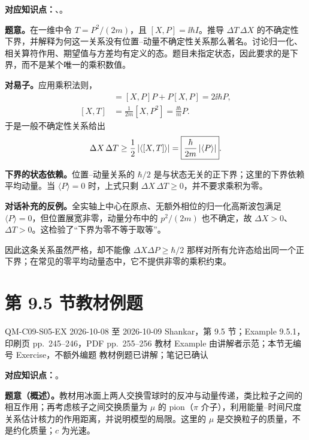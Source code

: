 \textbf{对应知识点：}、。

\textbf{题意。}在一维中令 $T=P^2/(2m)$，且 $[X,P]=\ii\hbar I$。推导 $\Delta T\,\Delta X$ 的不确定性下界，并解释为何这一关系没有位置--动量不确定性关系那么著名。讨论归一化、相关算符作用、期望值与方差均有定义的态。题目未指定状态，因此要求的是下界，而不是某个唯一的乘积数值。

\begin{checkedsolution}
\textbf{对易子。}应用乘积法则，
\begin{align}
  [X,P^2]&=[X,P]P+P[X,P]=2\ii\hbar P,\\
  [X,T]&=\frac1{2m}[X,P^2]=\boxed{\frac{\ii\hbar}{m}P}.
\end{align}
于是一般不确定性关系给出
\begin{equation}
  \Delta X\,\Delta T\ge\frac12\left|\langle[X,T]\rangle\right|
   =\boxed{\frac{\hbar}{2m}\left|\langle P\rangle\right|}.
\end{equation}

\textbf{下界的状态依赖。}位置--动量关系的 $\hbar/2$ 是与状态无关的正下界；这里的下界依赖平均动量。当 $\langle P\rangle=0$ 时，上式只剩 $\Delta X\,\Delta T\ge0$，并不要求乘积为零。

\textbf{对话补充的反例。}全实轴上中心在原点、无额外相位的归一化高斯波包满足 $\langle P\rangle=0$，但位置展宽非零，动量分布中的 $p^2/(2m)$ 也不确定，故 $\Delta X>0$、$\Delta T>0$。这检验了“下界为零不等于取等”。

因此这条关系虽然严格，却不能像 $\Delta X\Delta P\ge\hbar/2$ 那样对所有允许态给出同一个正下界；在常见的零平均动量态中，它不提供非零的乘积约束。
\end{checkedsolution}

\section{第 9.5 节教材例题}
\label{exercise-set:QM-C09-S05}
\exercisemeta
  {QM-C09-S05-EX}
  {2026-10-08 至 2026-10-09}
  {Shankar，第 9.5 节；Example 9.5.1，印刷页 pp.~245--246，PDF pp.~255--256}
  {教材 Example 由讲解者示范；本节无编号 Exercise，不额外编题}
  {教材例题已讲解；笔记已确认}

\textbf{对应知识点：}。

\textbf{题意（概述）。}教材用冰面上两人交换雪球时的反冲与动量传递，类比粒子之间的相互作用；再考虑核子之间交换质量为 $\mu$ 的 pion（$\pi$ 介子），利用能量--时间尺度关系估计核力的作用距离，并说明模型的局限。这里的 $\mu$ 是交换粒子的质量，不是约化质量；$c$ 为光速。

